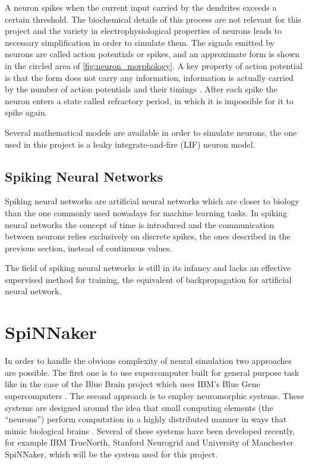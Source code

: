 A neuron spikes when the current input carried by the dendrites exceeds a certain threshold. The biochemical details of this process are not relevant for this project and the variety in electrophysiological properties of neurons \cite{Llinas:2008} leads to necessary simplification in order to simulate them. The signals emitted by neurons are called action potentials or spikes, and an approximate form is shown in the circled area of  \cref{fig:neuron_morphology}. A key property of action potential is that the form does not carry any information, information is actually carried by the number of action potentials and their timings \cite{Gerstner:2014}. After each spike the neuron enters a state called refractory period, in which it is impossible for it to spike again.

Several mathematical models are available in order to simulate neurons, the one used in this project is a leaky integrate-and-fire (LIF) neuron model. 


\subsection{Spiking Neural Networks}
Spiking neural networks are artificial neural networks which are closer to biology than the one commonly used nowadays for machine learning tasks. In spiking neural networks the concept of time is introduced and the communication between neurons relies exclusively on discrete spikes, the ones described in the previous section, instead of continuous values. 

The field of spiking neural networks is still in its infancy and lacks an effective supervised method for training, the equivalent of backpropagation for artificial neural network.


\section{SpiNNaker}
In order to handle the obvious complexity of neural simulation two approaches are possible. The first one is to use supercomputer built for general purpose task like in the case of the Blue Brain project which uses IBM's Blue Gene supercomputers \cite{Markram2006}. The second approach is to employ neuromorphic systems. These systems are designed around the idea that small computing elements (the ``neurons'') perform computation in a highly distributed manner in ways that mimic biological brains \cite{Furber2016}. Several of these systems have been developed recently, for example IBM TrueNorth, Stanford Neurogrid and University of Manchester SpiNNaker, which will be the system used for this project.

